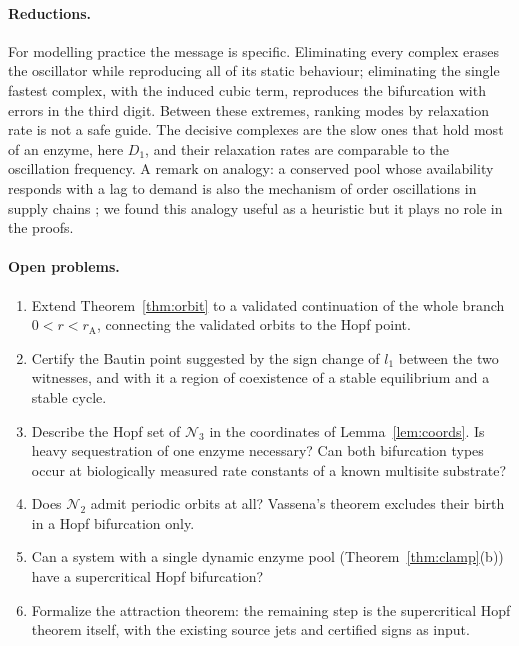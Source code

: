 \documentclass[11pt,a4paper]{article}
\theoremstyle{plain}
\theoremstyle{definition}
\theoremstyle{remark}
\newcommand{\cN}{\mathcal N}
\newcommand{\rA}{r_{\mathrm A}}
\begin{document}
\paragraph{Reductions.} For modelling practice the message is specific. Eliminating every complex erases the oscillator while reproducing all of its static behaviour; eliminating the single fastest complex, with the induced cubic term, reproduces the bifurcation with errors in the third digit. Between these extremes, ranking modes by relaxation rate is not a safe guide. The decisive complexes are the slow ones that hold most of an enzyme, here $D_1$, and their relaxation rates are comparable to the oscillation frequency. A remark on analogy: a conserved pool whose availability responds with a lag to demand is also the mechanism of order oscillations in supply chains \cite{Sterman89}; we found this analogy useful as a heuristic but it plays no role in the proofs.

\paragraph{Open problems.}
\begin{enumerate}[label=(\arabic*)]
\item Extend Theorem~\ref{thm:orbit} to a validated continuation of the whole branch $0<r<\rA$, connecting the validated orbits to the Hopf point.
\item Certify the Bautin point suggested by the sign change of $l_1$ between the two witnesses, and with it a region of coexistence of a stable equilibrium and a stable cycle.
\item Describe the Hopf set of $\cN_3$ in the coordinates of Lemma~\ref{lem:coords}. Is heavy sequestration of one enzyme necessary? Can both bifurcation types occur at biologically measured rate constants of a known multisite substrate?
\item Does $\cN_2$ admit periodic orbits at all? Vassena's theorem excludes their birth in a Hopf bifurcation only.
\item Can a system with a single dynamic enzyme pool (Theorem~\ref{thm:clamp}(b)) have a supercritical Hopf bifurcation?
\item Formalize the attraction theorem: the remaining step is the supercritical Hopf theorem itself, with the existing source jets and certified signs as input.
\end{enumerate}

\appendix
\end{document}

